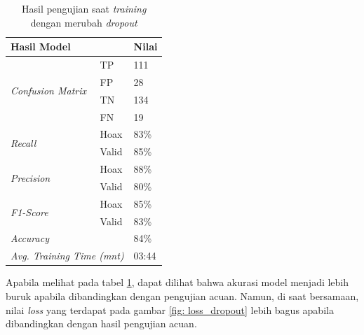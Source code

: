 \begin{table}[h]
    \caption{Hasil pengujian saat \textit{training} dengan merubah \textit{dropout}}
    \label{tab: loss_dropout}
    \centering
    \begin{tabular}{|l|l|l|}
        \hline
        \multicolumn{2}{|l|}{\textbf{Hasil Model}}              & \textbf{Nilai}        \\ \hline
        \multirow{4}{*}{\textit{Confusion Matrix}}              & TP             & 111  \\ \cline{2-3}
                                                                & FP             & 28   \\ \cline{2-3}
                                                                & TN             & 134  \\ \cline{2-3}
                                                                & FN             & 19   \\ \hline
        \multirow{2}{*}{\textit{Recall}}                        & Hoax           & 83\% \\ \cline{2-3}
                                                                & Valid          & 85\% \\ \hline
        \multirow{2}{*}{\textit{Precision}}                     & Hoax           & 88\% \\ \cline{2-3}
                                                                & Valid          & 80\% \\ \hline
        \multirow{2}{*}{\textit{F1-Score}}                      & Hoax           & 85\% \\ \cline{2-3}
                                                                & Valid          & 83\% \\ \hline
        \multicolumn{2}{|l|}{\textit{Accuracy}}                 & 84\%                  \\ \hline
        \multicolumn{2}{|l|}{\textit{Avg. Training Time (mnt)}} & 03:44                 \\ \hline
    \end{tabular}
\end{table}

Apabila melihat pada tabel \ref{tab: loss_dropout}, dapat dilihat bahwa akurasi model menjadi lebih buruk apabila dibandingkan dengan pengujian acuan. Namun, di saat bersamaan, nilai \textit{loss} yang terdapat pada gambar \ref{fig: loss_dropout} lebih bagus apabila dibandingkan dengan hasil pengujian acuan.
